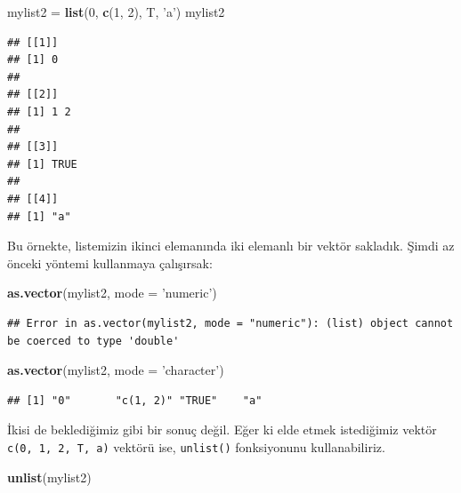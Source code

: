 \documentclass[]{book}
\newenvironment{Shaded}{\begin{snugshade}}{\end{snugshade}}
\newcommand{\DataTypeTok}[1]{\textcolor[rgb]{0.13,0.29,0.53}{#1}}
\newcommand{\DecValTok}[1]{\textcolor[rgb]{0.00,0.00,0.81}{#1}}
\newcommand{\KeywordTok}[1]{\textcolor[rgb]{0.13,0.29,0.53}{\textbf{#1}}}
\newcommand{\NormalTok}[1]{#1}
\newcommand{\StringTok}[1]{\textcolor[rgb]{0.31,0.60,0.02}{#1}}
\begin{document}
\begin{Shaded}
\begin{Highlighting}[]
\NormalTok{mylist2 =}\StringTok{ }\KeywordTok{list}\NormalTok{(}\DecValTok{0}\NormalTok{, }\KeywordTok{c}\NormalTok{(}\DecValTok{1}\NormalTok{, }\DecValTok{2}\NormalTok{), T, }\StringTok{'a'}\NormalTok{)}
\NormalTok{mylist2}
\end{Highlighting}
\end{Shaded}

\begin{verbatim}
## [[1]]
## [1] 0
## 
## [[2]]
## [1] 1 2
## 
## [[3]]
## [1] TRUE
## 
## [[4]]
## [1] "a"
\end{verbatim}

Bu örnekte, listemizin ikinci elemanında iki elemanlı bir vektör
sakladık. Şimdi az önceki yöntemi kullanmaya çalışırsak:

\begin{Shaded}
\begin{Highlighting}[]
\KeywordTok{as.vector}\NormalTok{(mylist2, }\DataTypeTok{mode =} \StringTok{'numeric'}\NormalTok{)}
\end{Highlighting}
\end{Shaded}

\begin{verbatim}
## Error in as.vector(mylist2, mode = "numeric"): (list) object cannot be coerced to type 'double'
\end{verbatim}

\begin{Shaded}
\begin{Highlighting}[]
\KeywordTok{as.vector}\NormalTok{(mylist2, }\DataTypeTok{mode =} \StringTok{'character'}\NormalTok{)}
\end{Highlighting}
\end{Shaded}

\begin{verbatim}
## [1] "0"       "c(1, 2)" "TRUE"    "a"
\end{verbatim}

İkisi de beklediğimiz gibi bir sonuç değil. Eğer ki elde etmek
istediğimiz vektör
\texttt{c(\textquotesingle{}0\textquotesingle{},\ \textquotesingle{}1\textquotesingle{},\ \textquotesingle{}2\textquotesingle{},\ \textquotesingle{}T\textquotesingle{},\ \textquotesingle{}a\textquotesingle{})}
vektörü ise, \texttt{unlist()} fonksiyonunu kullanabiliriz.

\begin{Shaded}
\begin{Highlighting}[]
\KeywordTok{unlist}\NormalTok{(mylist2)}
\end{Highlighting}
\end{Shaded}
\end{document}
